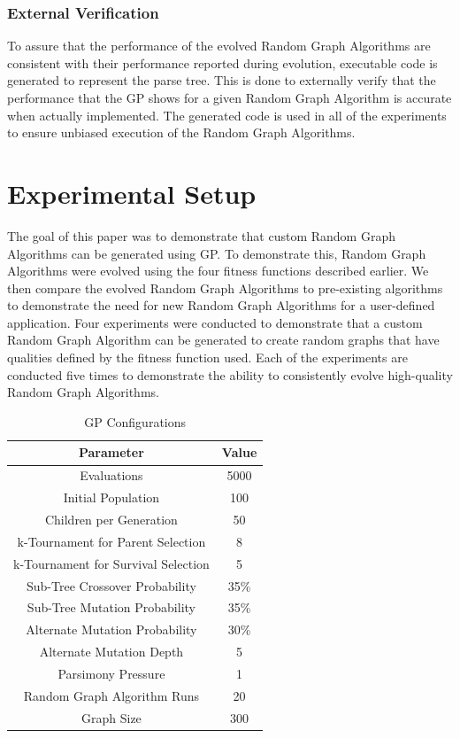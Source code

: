 \documentclass{article}
\begin{document}
\subsubsection{External Verification}
To assure that the performance of the evolved Random Graph Algorithms are consistent with their performance reported during evolution,
executable code is generated to represent the parse tree. This is done to externally verify that the performance that the GP shows for a
given Random Graph Algorithm is accurate when actually implemented. The generated code is used in all of the experiments to ensure unbiased execution 
of the Random Graph Algorithms.


\section{Experimental Setup}
The goal of this paper was to demonstrate that custom Random Graph Algorithms can be generated using GP. To demonstrate this, Random Graph Algorithms were evolved
using the four fitness functions described earlier. We then compare the evolved Random Graph Algorithms to pre-existing algorithms to demonstrate the need for new
Random Graph Algorithms for a user-defined application. Four experiments were conducted to demonstrate that a custom Random Graph Algorithm can be generated to 
create random graphs that have qualities defined by the fitness function used. Each of the experiments are conducted five times to demonstrate the ability to 
consistently evolve high-quality Random Graph Algorithms.

\begin{table}
    \begin{center}
    \begin{tabular}{|c|c|}
        \hline
        \textbf{Parameter} &\textbf{Value}\\ \hline
        Evaluations&5000\\ \hline
        Initial Population&100\\ \hline
        Children per Generation&50\\ \hline
        k-Tournament for Parent Selection&8\\ \hline
        k-Tournament for Survival Selection&5\\ \hline
	    Sub-Tree Crossover Probability& 35\% \\ \hline
	    Sub-Tree Mutation Probability& 35\% \\ \hline
	    Alternate Mutation Probability& 30\% \\ \hline
	    Alternate Mutation Depth& 5\\ \hline
	    Parsimony Pressure & 1\\ \hline
        Random Graph Algorithm Runs&20\\ \hline
        Graph Size&300\\ \hline
    \end{tabular}
    \end{center}
\caption{GP Configurations}
  \label{tab:GP}
\end{table}
\end{document}
